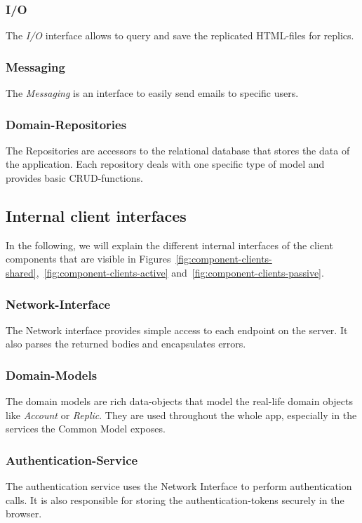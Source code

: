 \subsubsection{I/O}
The \textit{I/O} interface allows to query and save the replicated HTML-files for replics.

\subsubsection{Messaging}
The \textit{Messaging} is an interface to easily send emails to specific users.

\subsubsection{Domain-Repositories}
The Repositories are accessors to the relational database that stores the data of the application. \newline
Each repository deals with one specific type of model and provides basic CRUD-functions.

\subsection{Internal client interfaces}\label{subsec:internal-client-interfaces}
In the following, we will explain the different internal interfaces of the client components that are visible in Figures~\ref{fig:component-clients-shared},~\ref{fig:component-clients-active} and~\ref{fig:component-clients-passive}.

\subsubsection{Network-Interface}
The Network interface provides simple access to each endpoint on the server.
It also parses the returned bodies and encapsulates errors.

\subsubsection{Domain-Models}
The domain models are rich data-objects that model the real-life domain objects like \textit{Account} or \textit{Replic}.
They are used throughout the whole app, especially in the services the Common Model exposes.

\subsubsection{Authentication-Service}
The authentication service uses the Network Interface to perform authentication calls.
It is also responsible for storing the authentication-tokens securely in the browser.

